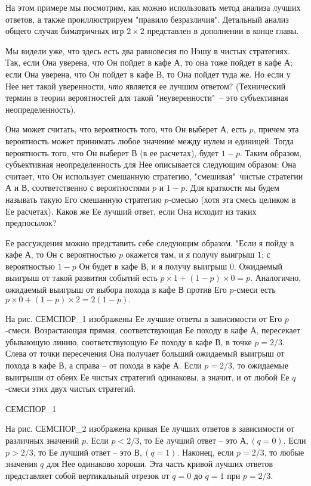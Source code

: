 \documentclass[12pt]{article}
\begin{document}
{На этом примере мы посмотрим, как можно использовать метод анализа лучших
ответов, а также проиллюстрируем "правило безразличия". Детальный анализ
общего случая биматричных игр $2\times2$ представлен в дополнении в конце главы.

Мы видели уже, что здесь есть два равновесия по Нэшу в чистых стратегиях.
Так, если Она уверена, что Он пойдет в кафе А, то она тоже пойдет в кафе А;
если Она уверена, что Он пойдет в кафе В, то Она пойдет туда же. Но если
у Нее нет такой уверенности, \emph{что} является ее лучшим ответом?
(Технический термин в теории вероятностей для такой "неуверенности"\, --
это субъективная неопределенность).

Она может считать, что вероятность того, что Он выберет А, есть
$p$, причем эта вероятность может принимать любое значение между нулем и единицей.
Тогда вероятность того, что Он выберет В (в ее расчетах), будет $1-p$.
Таким образом, субъективная неопределенность для Нее описывается следующим образом:
Она считает, что Он использует смешанную стратегию, "смешивая"\, чистые стратегии
А и В, соответственно с вероятностями $p$ и $1-p$. Для краткости мы будем называть
такую Его смешанную стратегию $p$-смесью (хотя эта смесь целиком в Ее расчетах).
Каков же Ее лучший ответ, если Она исходит из таких предпосылок?

Ее рассуждения можно представить себе следующим образом. "Если я пойду в кафе А,
то Он с вероятностью $p$ окажется там, и я получу выигрыш $1$; с вероятностью
$1-p$ Он будет в кафе В, и я получу выигрыш $0$. Ожидаемый выигрыш от такой развития
событий есть $p\times1+(1-p)\times0=p$. Аналогично, ожидаемый выигрыш от выбора
похода в кафе В против Его $p$-смеси есть $p\times0+(1-p)\times2=2(1-p).$

На рис. СЕМСПОР_1 изображены Ее лучшие ответы в зависимости от Его $p$-смеси.
Возрастающая прямая, соответствующая Ее походу в кафе А, пересекает убывающую
линию, соответствующую Ее походу в кафе В, в точке $p=2/3$. Слева от точки пересечения
Она получает больший ожидаемый выигрыш от похода в кафе В, а справа -- от похода в кафе А.
Если $p=2/3$, то ожидаемые выигрыши от обеих Ее чистых стратегий одинаковы, а значит,
и от любой Ее $q$-смеси этих двух чистых стратегий.

СЕМСПОР_1

На рис. СЕМСПОР_2 изображена кривая Ее лучших ответов в зависимости от различных значений $p$.
Если $p<2/3$, то Ее лучший ответ -- это $А, (q=0)$. Если $p>2/3$, то Ее лучший ответ --
это $В, (q=1)$. Наконец, если $p=2/3$, то любые значения $q$ для Нее одинаково хороши.
Эта часть кривой лучших ответов представляет собой вертикальный отрезок от $q=0$ до $q=1$
при $p=2/3$.

}
\end{document}
